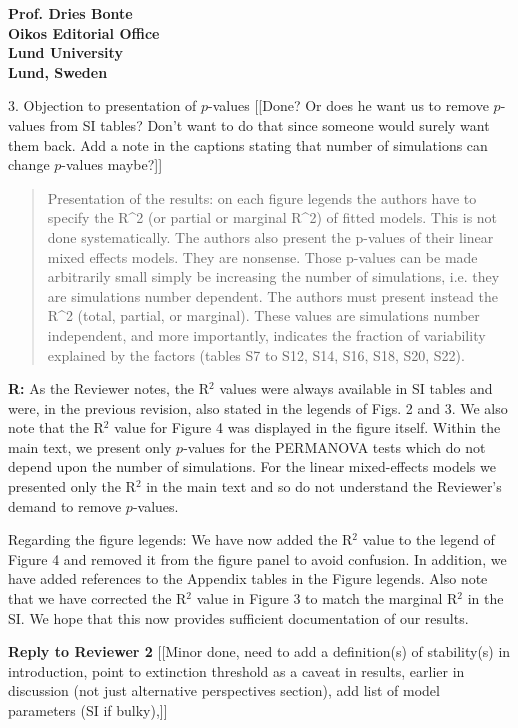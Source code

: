 \documentclass[12pt]{letter}
\begin{document}
\begin{letter}{\bf Prof. Dries Bonte\\
Oikos Editorial Office \\
Lund University \\
Lund, Sweden}
    \smallskip

    3. Objection to presentation of $p$-values [[Done? Or does he want us to remove $p$-values from SI tables? Don't want to do that since someone would surely want them back. Add a note in the captions stating that number of simulations can change $p$-values maybe?]]

      \begin{quotation}
        Presentation of the results: on each figure legends the authors have to specify the R^2 (or partial  or marginal R^2) of fitted models. This is not done systematically. The authors also present the p-values of their linear mixed effects models. They are nonsense. Those p-values can be made arbitrarily small simply be increasing the number of simulations, i.e. they are simulations number dependent. The authors must present instead the R^2 (total, partial, or marginal). These values are simulations number independent, and more importantly, indicates the fraction of variability explained by the factors (tables S7 to S12, S14, S16, S18, S20, S22).
      \end{quotation}

      \smallskip

      \textbf{R:} As the Reviewer notes, the R$^2$ values were always available in SI tables and were, in the previous revision, also stated in the legends of Figs. 2 and 3. We also note that the R$^2$ value for Figure 4 was displayed in the figure itself. Within the main text, we present only $p$-values for the PERMANOVA tests which do not depend upon the number of simulations. For the linear mixed-effects models we presented only the R$^2$ in the main text and so do not understand the Reviewer's demand to remove $p$-values.


      Regarding the figure legends: We have now added the R$^2$ value to the legend of Figure 4 and removed it from the figure panel to avoid confusion. In addition, we have added references to the Appendix tables in the Figure legends. Also note that we have corrected the R$^2$ value in Figure 3 to match the marginal R$^2$ in the SI. We hope that this now provides sufficient documentation of our results.



\clearpage

{\large\textbf{Reply to Reviewer 2}} [[Minor done, need to add a definition(s) of stability(s) in introduction, point to extinction threshold as a caveat in results, earlier in discussion (not just alternative perspectives section), add list of model parameters (SI if bulky),]]


\end{letter}
\end{document}
